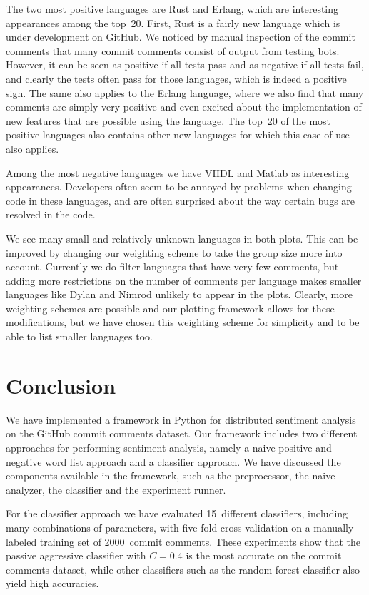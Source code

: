 \documentclass{article}
\begin{document}
The two most positive languages are Rust and Erlang, which are interesting 
appearances among the top~20. First, Rust is a fairly new language which is 
under development on GitHub. We noticed by manual inspection
of the commit comments that many commit comments consist of output from testing 
bots. However, it can be seen as positive if all tests pass and as negative if 
all tests fail, and clearly the tests often pass for those languages, which is 
indeed a positive sign. The same also applies to the Erlang language, where we 
also find that many comments are simply very positive and even excited about 
the implementation of new features that are possible using the language. The 
top~20 of the most positive languages also contains other new languages for 
which this ease of use also applies.

Among the most negative languages we have VHDL and Matlab as interesting 
appearances. Developers often seem to be annoyed by problems when changing
code in these languages, and are often surprised about the way certain bugs 
are resolved in the code.

We see many small and relatively unknown languages in both plots. This can be
improved by changing our weighting scheme to take the group size more into
account. Currently we do filter languages that have very few comments, but
adding more restrictions on the number of comments per language makes smaller
languages like Dylan and Nimrod unlikely to appear in the plots. Clearly,
more weighting schemes are possible and our plotting framework allows for
these modifications, but we have chosen this weighting scheme for simplicity
and to be able to list smaller languages too.

\section{Conclusion}\label{sec:conclusion}
We have implemented a framework in Python for distributed sentiment analysis on
the GitHub commit comments dataset. Our framework includes two different
approaches for performing sentiment analysis, namely a naive positive and
negative word list approach and a classifier approach. We have discussed the
components available in the framework, such as the preprocessor, the naive
analyzer, the classifier and the experiment runner.

For the classifier approach we have evaluated 15~different classifiers,
including many combinations of parameters, with five-fold cross-validation on
a manually labeled training set of 2000~commit comments. These experiments show
that the passive aggressive classifier with $C = 0.4$ is the most accurate on 
the commit comments dataset, while other classifiers such as the random forest 
classifier also yield high accuracies.
\end{document}
